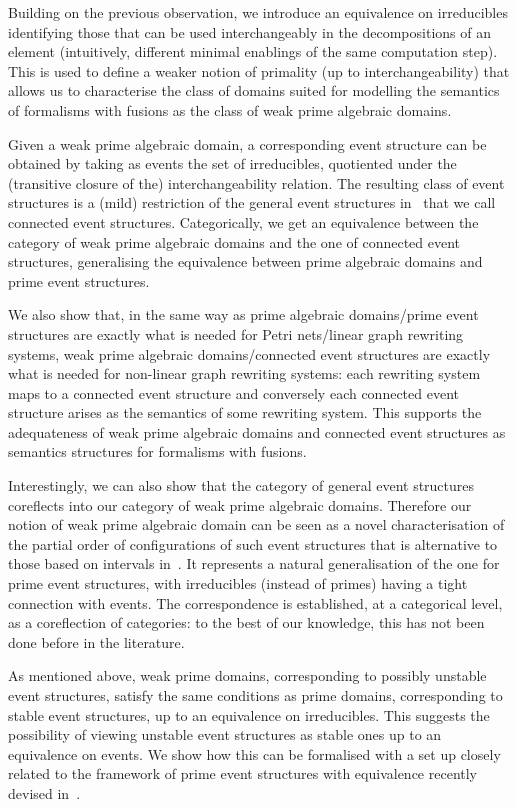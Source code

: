 Building on the previous observation, we introduce an equivalence on irreducibles
identifying those that can be used interchangeably in the
decompositions of an element (intuitively, different minimal enablings
of the same {computation step}). This is used to define a weaker notion of primality
(up to interchangeability) that allows us to characterise the class of domains
suited for modelling the semantics of formalisms with fusions {as}
the class of weak prime algebraic domains.

Given a weak prime algebraic domain, a corresponding event structure
can be obtained by taking as events the set of irreducibles,
quotiented under the (transitive closure of the) interchangeability
relation. The resulting class of event structures is a (mild)
restriction of the general event structures in~\cite{Win:ES}
that we call connected event structures. Categorically, we get an
equivalence between the category of weak prime algebraic domains and
the one of connected event structures, generalising the equivalence
between prime algebraic domains and prime event structures.

We also show that, in the same way as prime algebraic domains/prime
event structures are exactly what is needed for Petri nets/linear graph 
rewriting systems, weak prime
algebraic domains/connected event structures are exactly what is needed
for non-linear graph rewriting systems: each rewriting system maps to
a connected event structure and conversely each connected event structure
arises as the semantics of some rewriting system. This supports the
adequateness of weak prime algebraic domains and connected event
structures as semantics structures for formalisms with fusions.

Interestingly, we can also show that the category of general
event structures~\cite{Win:ES} coreflects into our category of weak
prime algebraic domains. Therefore our notion of weak prime algebraic
domain can be seen as a novel characterisation of the partial order of
configurations of such event structures that is alternative to those
based on intervals in~\cite{Winskel:phd,Dro:ESD}.  It represents a
natural generalisation of the one for prime event structures, with
irreducibles (instead of primes) having a tight connection with
events. The correspondence is established, at a categorical level, as a
coreflection of categories:
to the best of our knowledge, this {has} not been done before in the literature.


As mentioned above, weak prime domains, corresponding to possibly
unstable event structures, satisfy the same conditions as prime
domains, corresponding to stable event structures, up to an
equivalence on irreducibles. This suggests the possibility of viewing
unstable event structures as stable ones up to an equivalence on
events.
%
We show how this can be formalised  with a set up closely
related to the framework of prime event structures with equivalence 
recently devised in~\cite{win2017,VismeW19}.


